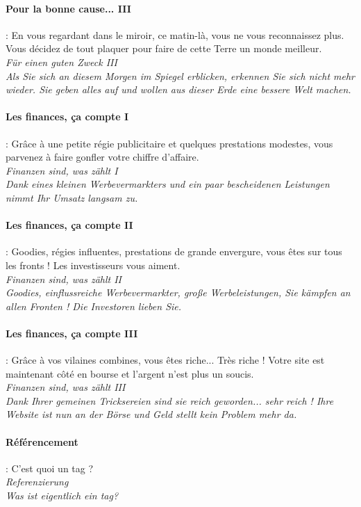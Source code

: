 \documentclass[10pt,a4paper]{article}
\begin{document}
\paragraph{Pour la bonne cause... III} : En vous regardant dans le miroir, ce matin-là, vous ne vous reconnaissez plus. Vous décidez de tout plaquer pour faire de cette Terre un monde meilleur.\\
\textit{Für einen guten Zweck III}\\
\textit{Als Sie sich an diesem Morgen im Spiegel erblicken, erkennen Sie sich nicht mehr wieder. Sie geben alles auf und wollen aus dieser Erde eine bessere Welt machen.}


\paragraph{Les finances, ça compte I} : Grâce à une petite régie publicitaire et quelques prestations modestes, vous parvenez à faire gonfler votre chiffre d'affaire.\\
\textit{Finanzen sind, was zählt I}\\
\textit{Dank eines kleinen Werbevermarkters und ein paar bescheidenen Leistungen nimmt Ihr Umsatz langsam zu.}


\paragraph{Les finances, ça compte II} : Goodies, régies influentes, prestations de grande envergure, vous êtes sur tous les fronts ! Les investisseurs vous aiment.\\
\textit{Finanzen sind, was zählt II}\\
\textit{Goodies, einflussreiche Werbevermarkter, gro\ss e Werbeleistungen, Sie kämpfen an allen Fronten ! Die Investoren lieben Sie.}


\paragraph{Les finances, ça compte III} : Grâce à vos vilaines combines, vous êtes riche... Très riche ! Votre site est maintenant côté en bourse et l'argent n'est plus un soucis.\\
\textit{Finanzen sind, was zählt III}\\
\textit{Dank Ihrer gemeinen Tricksereien sind sie reich geworden... sehr reich ! Ihre Website ist nun an der Börse und Geld stellt kein Problem mehr da.}


\paragraph{Référencement }: C'est quoi un tag ?\\
\textit{Referenzierung}\\
\textit{Was ist eigentlich ein tag?}
\end{document}
